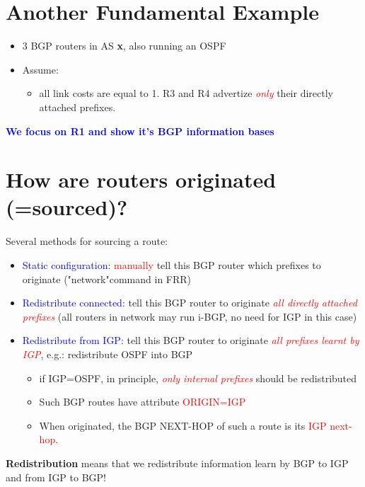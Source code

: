 \documentclass[11pt]{article}
\begin{document}
\section*{Another Fundamental Example}
\begin{itemize}
	\item 3 BGP routers in AS \textbf{x}, also running an OSPF
	\item Assume:
		\begin{itemize}
			\item all link costs are equal to 1. 
			\itrm R3 and R4 advertize \textcolor{red}{\textit{only}} their directly attached prefixes. 
		\end{itemize}
\end{itemize}

\vspace{0.3cm}
\textbf{\textcolor{blue}{We focus on R1 and show it's BGP information bases}}


\section*{How are routers originated (=sourced)?}

Several methods for sourcing a route:
\begin{itemize}
	\item \textcolor{blue}{Static configuration}: \textcolor{red}{manually} tell this BGP router which prefixes to originate ("network"command in FRR)
	\item \textcolor{blue}{Redistribute connected}: tell this BGP router to originate \textit{\textcolor{red}{all directly attached prefixes}} (all routers in network may run i-BGP, no need for IGP in this case)
	\item \textcolor{blue}{Redistribute from IGP}: tell this BGP router to originate \textcolor{red}{\textit{all prefixes learnt by IGP}}, e.g.: redistribute OSPF into BGP
		\begin{itemize}
			\item if IGP=OSPF, in principle, \textcolor{red}{\textit{only internal prefixes}} should be redistributed
			\item Such BGP routes have attribute \textcolor{red}{ORIGIN=IGP}
			\item When originated, the BGP NEXT-HOP of such a route is its \textcolor{red}{IGP next-hop}.
		\end{itemize}
\end{itemize}

\textbf{Redistribution} means that we redistribute information learn by BGP to IGP and from IGP to BGP! 
\end{document}
